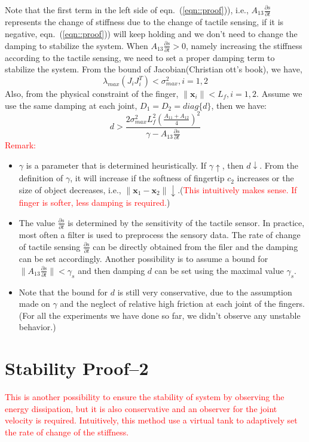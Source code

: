 \documentclass[]{article}
\begin{document}
Note that the first term in the left side of eqn.~(\ref{eqn::proof})), i.e., $A_{13}\frac{\partial s}{\partial t}$ represents the change of stiffness due to the change of tactile sensing, if it is negative, eqn.~(\ref{eqn::proof})) will keep holding and we don't need to change the damping to stabilize the system. When $A_{13}\frac{\partial s}{\partial t}>0$, namely increasing the stiffness according to the tactile sensing, we need to set a proper damping term to stabilize the system.
From the bound of Jacobian(Christian ott's book), we have,
\begin{equation}
\lambda_{max}(J_iJ_i^T)<\sigma_{max}^2, i=1,2
\end{equation}
Also, from the physical constraint of the finger, $\|\mathbf{x}_i\|<L_f, i=1,2$. Assume we use the same damping at each joint, $D_1=D_2=diag\{d\}$, then we have:
\begin{equation}
d>\frac{2\sigma_{max}^2L_f^2(\frac{A_{11}+A_{12}}{4})^2}{\gamma-A_{13}\frac{\partial s}{\partial t}}
\end{equation}
\textcolor{red}{Remark:}\begin{itemize}
\item $\gamma$ is a parameter that is determined heuristically. If $\gamma \uparrow$, then $d \downarrow$.
From the definition of $\gamma$, it will increase if the softness of fingertip $c_2$ increases or the size of object decreases, i.e., $\|\mathbf{x}_1-\mathbf{x}_2\| \downarrow$.(\textcolor{red}{This intuitively makes sense. If finger is softer, less damping is required.})
\item The value $\frac{\partial s}{\partial t}$ is determined by the sensitivity of the tactile sensor. In practice, most often a filter is used to preprocess the sensory data. The rate of change of tactile sensing $\frac{\partial s}{\partial t}$ can be directly obtained from the filer and the damping can be set accordingly. Another possibility is to assume a bound for $\|A_{13}\frac{\partial s}{\partial t}\|<\gamma_s$ and then damping $d$ can be set using the maximal value $\gamma_s$. 
\item Note that the bound for $d$  is still very conservative, due to the assumption made on $\gamma$ and the neglect of relative high friction at each joint of the fingers. (For all the experiments we have done so far, we didn't observe any unstable behavior.) 
\end{itemize}

\section{Stability Proof--2}
\textcolor{red}{This is another possibility to ensure the stability of system by observing the energy dissipation, but it is also conservative and an observer for the joint velocity is required. Intuitively, this method use a virtual tank to adaptively set the rate of change of the stiffness.}
\end{document}
